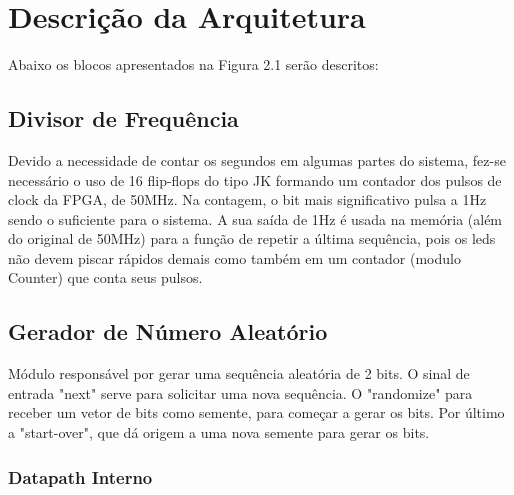 \documentclass{report}
\begin{document}
\paragraph{}

  

\chapter{Descrição da Arquitetura}

  Abaixo os blocos apresentados na Figura 2.1 serão descritos:

    
  \section{Divisor de Frequência}
  Devido a necessidade de contar os segundos em algumas partes do sistema, fez-se necessário o uso de 16 flip-flops do tipo JK formando um contador dos pulsos de clock da FPGA, de 50MHz. Na contagem, o bit mais significativo pulsa a 1Hz sendo o suficiente para o sistema. A sua saída de 1Hz é usada na memória (além do original de 50MHz) para a função de repetir a última sequência, pois os leds não devem piscar rápidos demais como também em um contador (modulo Counter) que conta seus pulsos.
  
    
 
    \section{Gerador de Número Aleatório}
  Módulo responsável por gerar uma sequência aleatória de 2 bits. O sinal de entrada "next" serve para solicitar uma nova sequência. O "randomize" para receber um vetor de bits como semente, para começar a gerar os bits. Por último a "start-over", que dá origem a uma nova semente para gerar os bits.
  
    \subsection{Datapath Interno}
    \paragraph{}
    
\end{document}

